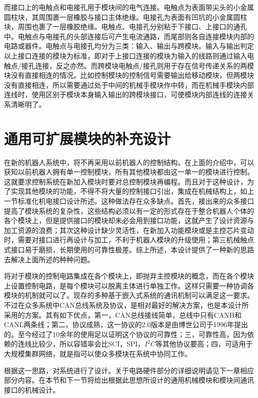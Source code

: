 而接口上的电触点和电接孔用于模块间的电气连接。电触点为表面带尖头的小金属圆柱块，其周围裹一层橡胶与接口主体绝缘。电接孔为表面有凹坑的小金属圆柱块，周围也裹了一层橡胶绝缘。电触点、电接孔分别粘于下接口、上接口的通孔中。电触点与电接孔的头部连接后可产生电流通路，而尾部则各自连接模块内部的电路或器件。电触点与电接孔均分为三类：输入、输出与跨模块。输入与输出判定以上接口连接的模块为标准，即对于上接口连接的模块为输入的线路则通过输入电触点/接孔连接，反之亦然。而跨模块电触点/接孔则用于存在信号传递关系的两模块没有直接相连的情况。比如控制模块的控制信号需要输出给移动模块，但两模块没有直接相连，所以需要通过处于中间的机械手模块作中转，而在机械手模块内部连线时，使用区别于模块本身输入输出的跨模块接口，可使模块内部连线的连接关系清晰明了。

\section{通用可扩展模块的补充设计}
在新的机器人系统中，将不再采用以前机器人的控制结构。在上面的介绍中，可以获知以前机器人拥有单一控制模块，所有其他模块都由这一单一的模块进行控制。这就要求控制系统在新加入模块时要对总控制模块再编程。而且对于这种设计，为了实现其他模块的功能，不得不将大量的控制接口引出，集成在机械结构上，如上一节标准化机电接口设计所述。这种做法存在众多缺点。首先，接出来的众多接口提高了模块系统的复杂性，这些结构必须以有一定的形式存在于整合机器人个体的各个模块上，但是提供接口的模块却未必会用到接口功能，这就产生了设计资源与加工资源的浪费；其次这种设计缺少灵活性，在新加入功能模块或是主控芯片变动时，需要对接口进行再设计与加工，不利于机器人模块的升级使用；第三机械触点式接口易于磨损，长期使用的可靠性极差。综上所述，本设计提供了一种新的思路去解决上面所述的种种问题。

将对于模块的控制电路集成在各个模块上，即抛弃主控模块的概念，而在各个模块上设置控制电路，是每个模块可以脱离主体进行单独工作。这样只需要一种协调各模块的机制就可以了。现存的多种基于嵌入式系统的通讯机制可以满足这一要求。不过在众多系统中CAN总线系统及协议，是相对最好的解决方案，也是本设计所采用的方案。其有如下优点，第一，CAN总线接线简单，总线中只有CANH和CANL两条线；第二，协议成熟，这一协议的2.0版本是由博世公司于1996年提出的。至今经过了10余年的使用足以证明这个协议的可靠性；三，可靠性高，因为依赖的连线比较少，所以容错率会比SCI，SPI，$I^2C$等其他协议要高；四，可适用于大规模集群网络，就是指可以使众多模块在系统中协同工作。

根据这一思路，对系统进行了设计。关于电路硬件部分的详细说明请见下一章相应部分内容。在本节和下一节将给出根据此思想所设计的通用机械模块和模块间通讯接口的机械设计。

